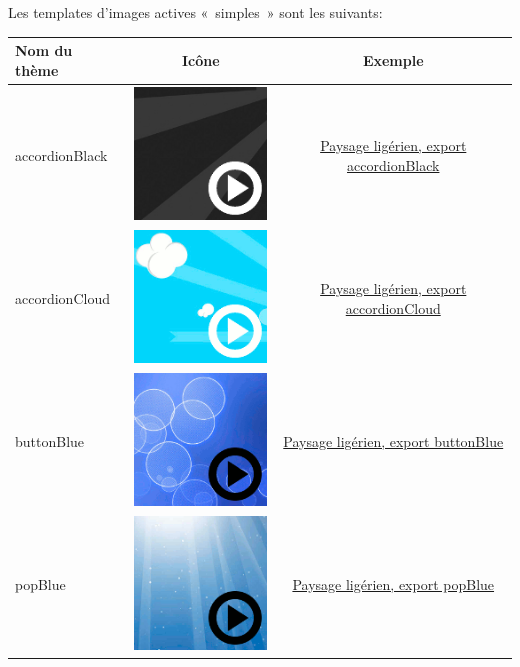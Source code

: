 \documentclass[a4paper,12pt]{report}
\begin{document}
Les templates d'images actives «~simples~» sont les suivants:
\begin{center}
\begin{tabular}{|l|c|c|}
\hline
Nom du thème & Icône & Exemple\\
\hline
accordionBlack\  & \includegraphics[scale=0.5]{./images/accordionBlack} & \href{http://geoffrey-gekiere.ac-versailles.fr/xia1/accordionBlack}{Paysage ligérien, export accordionBlack}\\
\hline
accordionCloud &  \includegraphics[scale=0.5]{./images/accordionCloud} & \href{http://geoffrey-gekiere.ac-versailles.fr/xia1/accordionCloud}{Paysage ligérien, export accordionCloud}\\
\hline
buttonBlue &  \includegraphics[scale=0.5]{./images/buttonBlue} & \href{http://geoffrey-gekiere.ac-versailles.fr/xia1/buttonBlue}{Paysage ligérien, export buttonBlue}\\
\hline
popBlue &  \includegraphics[scale=0.5]{./images/popBlue} & \href{http://geoffrey-gekiere.ac-versailles.fr/xia1/popBlue}{Paysage ligérien, export popBlue}\\

\end{tabular}
\end{center}
\end{document}

